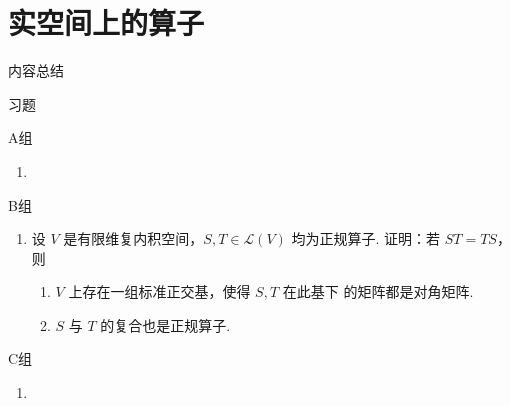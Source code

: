 \chapter{实空间上的算子}

\vspace{2ex}
\centerline{\heiti \Large 内容总结}

\vspace{2ex}

\centerline{\heiti \Large 习题}
\vspace{2ex}
{\kaishu }
\begin{flushright}
    \kaishu

\end{flushright}
\centerline{\heiti A组}
\begin{enumerate}
    \item
\end{enumerate}
\centerline{\heiti B组}
\begin{enumerate}
    \item 设 $ V $ 是有限维复内积空间，$ S, T \in \mathcal{L}(V) $ 均为正规算子. 
    证明：若 $ ST = TS $，则
    \begin{enumerate}
        \item $ V $ 上存在一组标准正交基，使得 $ S, T $ 在此基下
        的矩阵都是对角矩阵. 

        \item $ S $ 与 $ T $ 的复合也是正规算子. 
    \end{enumerate} 
\end{enumerate}
\centerline{\heiti C组}
\begin{enumerate}
    \item
\end{enumerate}
